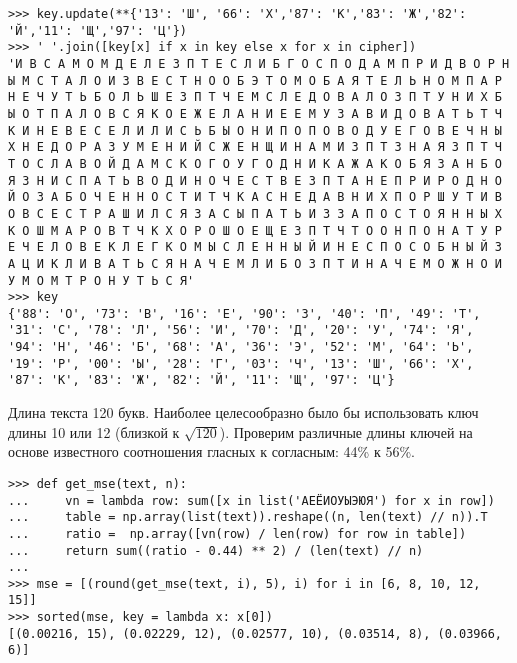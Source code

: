 \documentclass[letterpaper,11pt,openany]{book}
\begin{document}
\begin{lstlisting}
>>> key.update(**{'13': 'Ш', '66': 'Х','87': 'К','83': 'Ж','82': 'Й','11': 'Щ','97': 'Ц'})
>>> ' '.join([key[x] if x in key else x for x in cipher])
'И В С А М О М Д Е Л Е З П Т Е С Л И Б Г О С П О Д А М П Р И Д В О Р Н Ы М С Т А Л О И З В Е С Т Н О О Б Э Т О М О Б А Я Т Е Л Ь Н О М П А Р Н Е Ч У Т Ь Б О Л Ь Ш Е З П Т Ч Е М С Л Е Д О В А Л О З П Т У Н И Х Б Ы О Т П А Л О В С Я К О Е Ж Е Л А Н И Е Е М У З А В И Д О В А Т Ь Т Ч К И Н Е В Е С Е Л И Л И С Ь Б Ы О Н И П О П О В О Д У Е Г О В Е Ч Н Ы Х Н Е Д О Р А З У М Е Н И Й С Ж Е Н Щ И Н А М И З П Т З Н А Я З П Т Ч Т О С Л А В О Й Д А М С К О Г О У Г О Д Н И К А Ж А К О Б Я З А Н Б О Я З Н И С П А Т Ь В О Д И Н О Ч Е С Т В Е З П Т А Н Е П Р И Р О Д Н О Й О З А Б О Ч Е Н Н О С Т И Т Ч К А С Н Е Д А В Н И Х П О Р Ш У Т И В О В С Е С Т Р А Ш И Л С Я З А С Ы П А Т Ь И З З А П О С Т О Я Н Н Ы Х К О Ш М А Р О В Т Ч К Х О Р О Ш О Е Щ Е З П Т Ч Т О О Н П О Н А Т У Р Е Ч Е Л О В Е К Л Е Г К О М Ы С Л Е Н Н Ы Й И Н Е С П О С О Б Н Ы Й З А Ц И К Л И В А Т Ь С Я Н А Ч Е М Л И Б О З П Т И Н А Ч Е М О Ж Н О И У М О М Т Р О Н У Т Ь С Я'
>>> key
{'88': 'О', '73': 'В', '16': 'Е', '90': 'З', '40': 'П', '49': 'Т', '31': 'С', '78': 'Л', '56': 'И', '70': 'Д', '20': 'У', '74': 'Я', '94': 'Н', '46': 'Б', '68': 'А', '36': 'Э', '52': 'М', '64': 'Ь', '19': 'Р', '00': 'Ы', '28': 'Г', '03': 'Ч', '13': 'Ш', '66': 'Х', '87': 'К', '83': 'Ж', '82': 'Й', '11': 'Щ', '97': 'Ц'}
\end{lstlisting}


Длина текста 120 букв. Наиболее целесообразно было бы использовать ключ длины 10 или 12 (близкой к $\sqrt{120}$). Проверим различные длины ключей на основе известного соотношения гласных к согласным: 44\% к 56\%.

\medskip

\begin{lstlisting}
>>> def get_mse(text, n):
...     vn = lambda row: sum([x in list('АЕЁИОУЫЭЮЯ') for x in row])
...     table = np.array(list(text)).reshape((n, len(text) // n)).T
...     ratio =  np.array([vn(row) / len(row) for row in table])
... 	return sum((ratio - 0.44) ** 2) / (len(text) // n)
...
>>> mse = [(round(get_mse(text, i), 5), i) for i in [6, 8, 10, 12, 15]]
>>> sorted(mse, key = lambda x: x[0])
[(0.00216, 15), (0.02229, 12), (0.02577, 10), (0.03514, 8), (0.03966, 6)]
\end{lstlisting}
\end{document}
